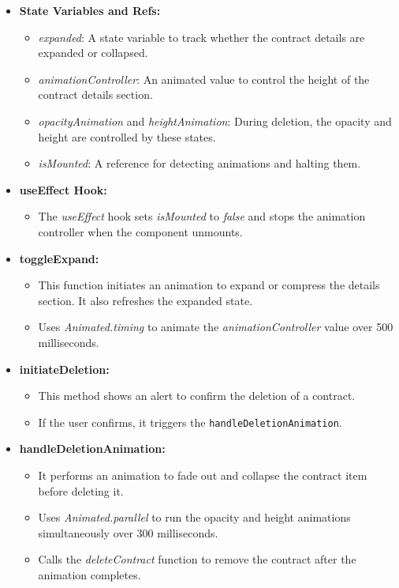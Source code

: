 \begin{itemize}
    \item \textbf{State Variables and Refs:}
    \begin{itemize}
        \item \textit{expanded}: A state variable to track whether the contract details are expanded or collapsed.
        \item \textit{animationController}: An animated value to control the height of the contract details section.
        \item \textit{opacityAnimation} and \textit{heightAnimation}: During deletion, the opacity and height are controlled by these states.
        \item \textit{isMounted}: A reference for detecting animations and halting them.
    \end{itemize}

    \item \textbf{useEffect Hook:}
    \begin{itemize}
        \item The \textit{useEffect} hook sets \textit{isMounted} to \textit{false} and stops the animation controller when the component unmounts.
    \end{itemize}

    \item \textbf{toggleExpand:}
    \begin{itemize}
        \item This function initiates an animation to expand or compress the details section. It also refreshes the expanded state.
        \item Uses \textit{Animated.timing} to animate the \textit{animationController} value over 500 milliseconds.
    \end{itemize}

    \item \textbf{initiateDeletion:}
    \begin{itemize}
        \item This method shows an alert to confirm the deletion of a contract.
        \item If the user confirms, it triggers the \texttt{handleDeletionAnimation}.
    \end{itemize}

    \item \textbf{handleDeletionAnimation:}
    \begin{itemize}
        \item It performs an animation to fade out and collapse the contract item before deleting it.
        \item Uses \textit{Animated.parallel} to run the opacity and height animations simultaneously over 300 milliseconds.
        \item Calls the \textit{deleteContract} function to remove the contract after the animation completes.
    \end{itemize}


\end{itemize}
